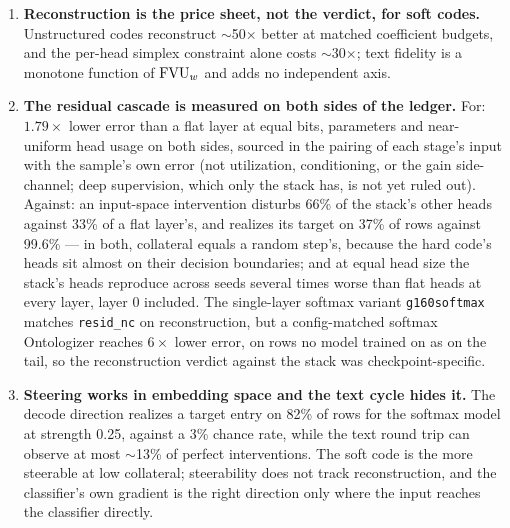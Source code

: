 \begin{enumerate}
800-bit hard code with signed atoms in activation space and gain-shape
on every layer recovers 97.6\% of GPT-2's loss, more than a $k_{\mathrm{SAE}}{=}32$ SAE
at nearly the same $\fvu$ (96.2\%), and 64 entries per head pass it on
both measures. Across architectures $\fvu$ does not order downstream
loss. Fibers on top of a frozen discrete base recover almost all the rest
(99.9\%) while leaving the base exactly as it was, so a discrete ontology
and a near-lossless reconstruction need not trade against each other ---
at the price of hundreds of continuous numbers per token.
\item \textbf{Reconstruction is the price sheet, not the verdict, for
soft codes.} Unstructured codes reconstruct $\sim$50$\times$ better at
matched coefficient budgets, and the per-head simplex constraint alone
costs $\sim$30$\times$; text fidelity is a monotone function of $\fvu$
and adds no independent axis.
\item \textbf{The residual cascade is measured on both sides of the
ledger.} For: $1.79\times$ lower error than a flat layer at equal bits,
parameters and near-uniform head usage on both sides, sourced in the pairing of each stage's
input with the sample's own error (not utilization, conditioning, or the
gain side-channel; deep supervision, which only the stack has, is not yet
ruled out). Against: an input-space intervention disturbs 66\%
of the stack's other heads against 33\% of a flat layer's, and realizes
its target on 37\% of rows against 99.6\% --- in both, collateral equals
a random step's, because the hard code's heads sit almost on their
decision boundaries; and
at equal head size the stack's heads reproduce across seeds several
times worse than flat heads at every layer, layer 0 included. The
single-layer softmax variant \texttt{g160softmax} matches \texttt{resid\_nc} on
reconstruction, but a config-matched softmax Ontologizer reaches
$6\times$ lower error, on rows no model trained on as on the tail, so the
reconstruction verdict against the stack was checkpoint-specific.
\item \textbf{Steering works in embedding space and the text cycle hides
it.} The decode direction realizes a target entry on 82\% of rows for the
softmax model at strength 0.25, against a 3\% chance rate, while the
text round trip can observe at most $\sim$13\% of perfect interventions.
The soft code is the more steerable at low collateral; steerability does
not track reconstruction, and the classifier's own gradient is the right
direction only where the input reaches the classifier directly.

\end{enumerate}
